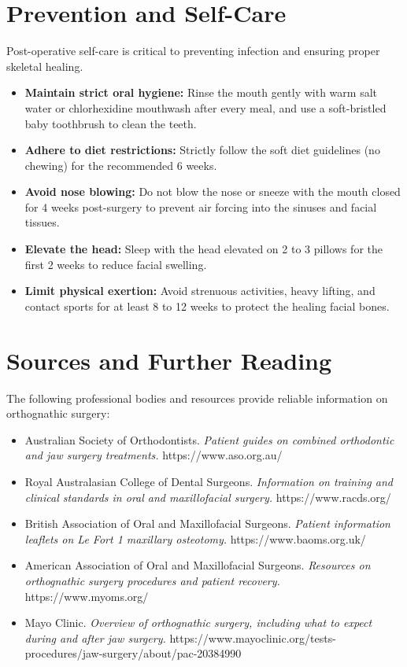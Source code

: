 \section*{Prevention and Self-Care}
Post-operative self-care is critical to preventing infection and ensuring proper skeletal healing.
\begin{itemize}
    \item \textbf{Maintain strict oral hygiene:} Rinse the mouth gently with warm salt water or chlorhexidine mouthwash after every meal, and use a soft-bristled baby toothbrush to clean the teeth.
    \item \textbf{Adhere to diet restrictions:} Strictly follow the soft diet guidelines (no chewing) for the recommended 6 weeks.
    \item \textbf{Avoid nose blowing:} Do not blow the nose or sneeze with the mouth closed for 4 weeks post-surgery to prevent air forcing into the sinuses and facial tissues.
    \item \textbf{Elevate the head:} Sleep with the head elevated on 2 to 3 pillows for the first 2 weeks to reduce facial swelling.
    \item \textbf{Limit physical exertion:} Avoid strenuous activities, heavy lifting, and contact sports for at least 8 to 12 weeks to protect the healing facial bones.
\end{itemize}

\section*{Sources and Further Reading}
The following professional bodies and resources provide reliable information on orthognathic surgery:
\begin{itemize}
    \item Australian Society of Orthodontists. \textit{Patient guides on combined orthodontic and jaw surgery treatments.} https://www.aso.org.au/
    \item Royal Australasian College of Dental Surgeons. \textit{Information on training and clinical standards in oral and maxillofacial surgery.} https://www.racds.org/
    \item British Association of Oral and Maxillofacial Surgeons. \textit{Patient information leaflets on Le Fort 1 maxillary osteotomy.} https://www.baoms.org.uk/
    \item American Association of Oral and Maxillofacial Surgeons. \textit{Resources on orthognathic surgery procedures and patient recovery.} https://www.myoms.org/
    \item Mayo Clinic. \textit{Overview of orthognathic surgery, including what to expect during and after jaw surgery.} https://www.mayoclinic.org/tests-procedures/jaw-surgery/about/pac-20384990
\end{itemize}
